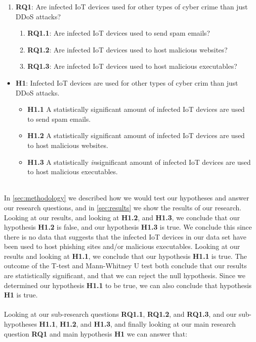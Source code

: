 \documentclass[a4paper,10pt]{article}
\begin{document}
\begin{enumerate}
 \item[] \textbf{RQ1}: Are infected IoT devices used for other types of cyber crime than just DDoS attacks? 
 \begin{enumerate}
  \item[] \textbf{RQ1.1}: Are infected IoT devices used to send spam emails? 
  \item[] \textbf{RQ1.2}: Are infected IoT devices used to host malicious websites? 
  \item[] \textbf{RQ1.3}: Are infected IoT devices used to host malicious executables? 
 \end{enumerate}
\end{enumerate}
\begin{itemize}
  \item[] \textbf{H1}: Infected IoT devices are used for other types of cyber crim than just DDoS attacks.
  \begin{itemize}
    \item[] \textbf{H1.1} A statistically significant amount of infected IoT devices are used to send spam emails.
    \item[] \textbf{H1.2} A statistically significant amount of infected IoT devices are used to host malicious websites.
    \item[] \textbf{H1.3} A statistically \textit{in}significant amount of infected IoT devices are used to host malicious 
    executables.
  \end{itemize}
\end{itemize}
~\\
In \autoref{sec:methodology} we described how we would test our hypotheses and answer our research questions, and
in \autoref{sec:results} we show the results of our research. Looking at our results, and  looking at \textbf{H1.2}, and 
\textbf{H1.3}, we conclude that our hypothesis \textbf{H1.2} is false, and our hypothesis \textbf{H1.3} is true. We conclude 
this since there is no data that suggests that the infected IoT devices in our data set have been used to host phishing sites 
and/or malicious executables. Looking at our results and looking at \textbf{H1.1}, we conclude that our hypothesis 
\textbf{H1.1} is true. The outcome of the T-test and Mann-Whitney U test both conclude that our results are statistically
significant, and that we can reject the null hypothesis. Since we determined our hypothesis \textbf{H1.1} to be true, we
can also conclude that hypothesis \textbf{H1} is true.
\\\\
Looking at our sub-research questions \textbf{RQ1.1}, \textbf{RQ1.2}, and \textbf{RQ1.3}, and our sub-hypotheses
\textbf{H1.1}, \textbf{H1.2}, and \textbf{H1.3}, and finally looking at our main research question \textbf{RQ1} and main
hypothesis \textbf{H1} we can answer that:
\end{document}
